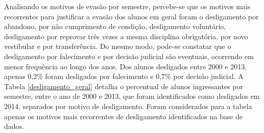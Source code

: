  Analisando os motivos de evasão por semestre, percebe-se que os motivos mais recorrentes para justificar a evasão dos alunos em geral foram o desligamento por abandono, por não cumprimento de condição, desligamento voluntário, desligamento por reprovar três vezes a mesma disciplina obrigatória, por novo vestibular e por transferência. Do mesmo modo, pode-se constatar que o desligamento por falecimento e por decisão judicial são eventuais, ocorrendo em menor frequência ao longo dos anos. Dos alunos desligados entre 2000 e 2013, apenas 0,2\% foram desligados por falecimento e 0,7\% por decisão judicial. A Tabela \ref{desligamento_geral} detalha o percentual de alunos ingressantes por semestre, entre o ano de 2000 e 2013, que foram identificados como desligados em 2014, separados por motivo de desligamento. Foram considerados para a tabela apenas os motivos mais recorrentes de desligamento identificados na base de dados.
 
